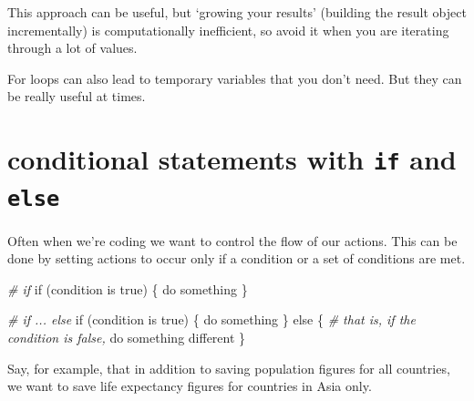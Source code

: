 \documentclass[]{book}
\newenvironment{Shaded}{\begin{snugshade}}{\end{snugshade}}
\newcommand{\CommentTok}[1]{\textcolor[rgb]{0.56,0.35,0.01}{\textit{{#1}}}}
\newcommand{\NormalTok}[1]{{#1}}
\theoremstyle{definition}
\theoremstyle{definition}
\theoremstyle{definition}
\theoremstyle{remark}
\begin{document}
This approach can be useful, but `growing your results' (building the
result object incrementally) is computationally inefficient, so avoid it
when you are iterating through a lot of values.

For loops can also lead to temporary variables that you don't need. But
they can be really useful at times.

\section{\texorpdfstring{conditional statements with \texttt{if} and
\texttt{else}}{conditional statements with if and else}}\label{conditional-statements-with-if-and-else}

Often when we're coding we want to control the flow of our actions. This
can be done by setting actions to occur only if a condition or a set of
conditions are met.

\begin{Shaded}
\begin{Highlighting}[]
\CommentTok{# if}
\NormalTok{if (condition is true) \{}
  \NormalTok{do something}
\NormalTok{\}}

\CommentTok{# if ... else}
\NormalTok{if (condition is true) \{}
  \NormalTok{do something}
\NormalTok{\} else \{  }\CommentTok{# that is, if the condition is false,}
  \NormalTok{do something different}
\NormalTok{\}}
\end{Highlighting}
\end{Shaded}

Say, for example, that in addition to saving population figures for all
countries, we want to save life expectancy figures for countries in Asia
only.
\end{document}
